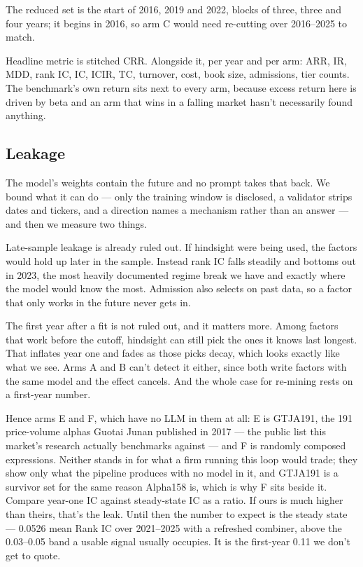 \documentclass[11pt]{article}
\begin{document}
The reduced set is the start of 2016, 2019 and 2022, blocks of three, three and four
years; it begins in 2016, so arm C would need re-cutting over 2016--2025 to match.

Headline metric is stitched CRR. Alongside it, per year and per arm: ARR, IR, MDD,
rank IC, IC, ICIR, TC, turnover, cost, book size, admissions, tier counts. The
benchmark's own return sits next to every arm, because excess return here is driven
by beta and an arm that wins in a falling market hasn't necessarily found anything.

\subsection{Leakage}
\label{sec:leak}

The model's weights contain the future and no prompt takes that back. We bound what
it can do --- only the training window is disclosed, a validator strips dates and
tickers, and a direction names a mechanism rather than an answer --- and then we
measure two things.

Late-sample leakage is already ruled out. If hindsight were being used, the factors
would hold up later in the sample. Instead rank IC falls steadily and bottoms out
in 2023, the most heavily documented regime break we have and exactly where the
model would know the most. Admission also selects on past data, so a factor that
only works in the future never gets in.

The first year after a fit is not ruled out, and it matters more. Among factors
that work before the cutoff, hindsight can still pick the ones it knows last
longest. That inflates year one and fades as those picks decay, which looks exactly
like what we see. Arms A and B can't detect it either, since both write factors
with the same model and the effect cancels. And the whole case for re-mining rests
on a first-year number.

Hence arms E and F, which have no LLM in them at all: E is GTJA191, the 191 price-volume
alphas Guotai Junan published in 2017 --- the public list this market's research actually
benchmarks against --- and F is randomly composed expressions. Neither stands in for what
a firm running this loop would trade; they show only what the pipeline produces with no
model in it, and GTJA191 is a survivor set for the same reason Alpha158 is, which is why F
sits beside it. Compare year-one IC
against steady-state IC as a ratio. If ours is much higher than theirs, that's the leak.
Until then the number to expect is the steady state --- 0.0526 mean Rank IC over
2021--2025 with a refreshed combiner, above the 0.03--0.05 band a usable signal
usually occupies. It is the first-year 0.11 we don't get to quote.
\end{document}
